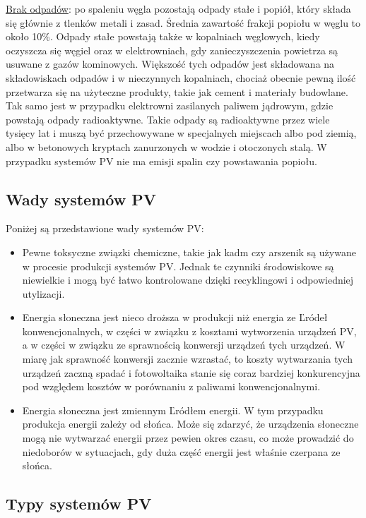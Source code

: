 \documentclass[12pt,a4paper]{article}
\begin{document}
\underline{Brak odpadów}: po spaleniu węgla pozostają odpady stałe i popiół, który 
składa się głównie z tlenków metali i zasad. Średnia zawartość frakcji 
popiołu w węglu to około 10\%. Odpady stałe powstają także w kopalniach 
węglowych, kiedy oczyszcza się węgiel oraz w elektrowniach, gdy 
zanieczyszczenia powietrza są usuwane z gazów kominowych. Większość tych 
odpadów jest składowana na składowiskach odpadów i w nieczynnych 
kopalniach, chociaż obecnie pewną ilość przetwarza się na użyteczne 
produkty, takie jak cement i materiały budowlane. Tak samo jest w 
przypadku elektrowni zasilanych paliwem jądrowym, gdzie powstają odpady 
radioaktywne. Takie odpady są radioaktywne przez wiele tysięcy lat i 
muszą być przechowywane w specjalnych miejscach albo pod ziemią, albo w 
betonowych kryptach zanurzonych w wodzie i otoczonych stalą. W przypadku 
systemów PV nie ma emisji spalin czy powstawania popiołu. 

\subsection{Wady systemów PV}
Poniżej są przedstawione wady systemów PV: 

\begin{itemize}
\item Pewne toksyczne związki chemiczne, takie jak kadm czy arszenik są 
używane w procesie produkcji systemów PV. Jednak te czynniki 
środowiskowe są niewielkie i mogą być łatwo kontrolowane dzięki 
recyklingowi i odpowiedniej utylizacji. 
\item Energia słoneczna jest nieco droższa w produkcji niż energia ze 
Ľródeł konwencjonalnych, w części w związku z kosztami wytworzenia 
urządzeń PV, a w części w związku ze sprawnością konwersji urządzeń tych 
urządzeń. W miarę jak sprawność konwersji zacznie wzrastać, to koszty 
wytwarzania tych urządzeń zaczną spadać i fotowoltaika stanie się coraz 
bardziej konkurencyjna pod względem kosztów w porównaniu z paliwami 
konwencjonalnymi. 
\item Energia słoneczna jest zmiennym Ľródłem energii. W tym przypadku 
produkcja energii zależy od słońca. Może się zdarzyć, że urządzenia 
słoneczne mogą nie wytwarzać energii przez pewien okres czasu, co może 
prowadzić do niedoborów w sytuacjach, gdy duża część energii jest 
właśnie czerpana ze słońca. 
\end{itemize}

\subsection{Typy systemów PV }
\end{document}
